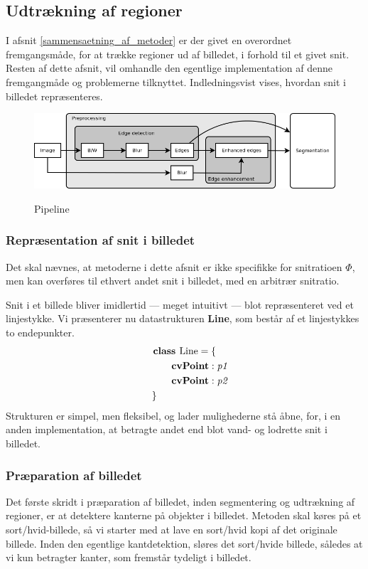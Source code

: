 {\subsection{Udtrækning af regioner}
I afsnit \ref{sammensaetning_af_metoder} er der givet en overordnet
fremgangsmåde, for at trække regioner ud af billedet, i forhold til et
givet snit. Resten af dette afsnit, vil omhandle den egentlige
implementation af denne fremgangmåde og problemerne tilknyttet.
Indledningsvist vises, hvordan snit i billedet repræsenteres.
\begin{figure}[!h]
    \includegraphics[width=\textwidth]{afsnit/implementation/billeder/billedbehandling/pipeline.png}
    \label{pipeline}
    \caption{Pipeline}
\end{figure}

\subsubsection{Repræsentation af snit i billedet}
Det skal nævnes, at metoderne i dette afsnit er ikke
specifikke for snitratioen $\varPhi$, men kan overføres til ethvert
andet snit i billedet, med en arbitrær snitratio.

Snit i et billede bliver imidlertid --- meget intuitivt --- blot
repræsenteret ved et linjestykke. Vi præsenterer nu datastrukturen
\textbf{Line}, som består af et linjestykkes to endepunkter.
\begin{multline}
    \textbf{class~} \textrm{Line} = \{ \\
    \shoveleft{\qquad\textbf{cvPoint} : \textit{p1}} \\
    \shoveleft{\qquad\textbf{cvPoint} : \textit{p2}} \\
    \shoveleft{\}}\shoveright{}
    \label{Line_class}
\end{multline}
Strukturen er simpel, men fleksibel, og lader mulighederne stå åbne,
for, i en anden implementation, at betragte andet end blot vand- og
lodrette snit i billedet.

\subsubsection{Præparation af billedet}
Det første skridt i præparation af billedet, inden segmentering og
udtrækning af regioner, er at detektere kanterne på objekter i billedet.
Metoden skal køres på et sort/hvid-billede, så vi starter med at lave en
sort/hvid kopi af det originale billede. Inden den egentlige
kantdetektion, sløres det sort/hvide billede, således at vi kun
betragter kanter, som fremstår tydeligt i billedet.

}
